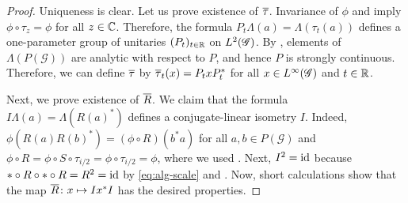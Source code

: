 \begin{proof}
  Uniqueness is clear.  Let us prove existence of $\overline{\tau}$.
  Invariance of $\phi$ and \cite[Theorem 2.25]{DCT1} imply $\phi \circ
  \tau_{z} = \phi$ for all $z\in \mathbb{C}$. Therefore, the formula
  $P_{t}\Lambda(a) = \Lambda(\tau_{t}(a))$ defines a one-parameter
  group of unitaries $(P_{t})_{t\in \mathbb{R}}$ on $L^{2}(\mathscr{G})$. By \cite[Theorem
  2.25]{DCT1}, elements of $\Lambda(P(\mathscr{G}))$ are analytic with
  respect to $P$, and hence $P$ is strongly
  continuous.  Therefore, we can define $\overline{\tau}$ by  $\overline{\tau}_{t}(x)=
  P_{t}xP_{t}^{*}$ for all $x\in L^{\infty}(\mathscr{G})$ and $t\in \mathbb{R}$.
  

  Next, we prove existence of $\overline{R}$. We claim that the formula $
  I\Lambda(a) = \Lambda(R(a)^{*})$ defines a conjugate-linear
  isometry $I$. Indeed, $\phi(R(a)R(b)^{*})= (\phi\circ R)(b^{*}a)$
  for all $a,b\in P(\mathscr{G})$ and $\phi \circ R=\phi \circ S \circ
  \tau_{i/2} = \phi \circ \tau_{i/2}=\phi$, where we used \cite[
  Corollary 2.13]{DCT1}. Next, $I^{2} = \operatorname{id}$ because $*\circ R \circ *
  \circ R= R^{2}=\operatorname{id}$ by \eqref{eq:alg-scale} and \cite[Proposition 1.16]{DCT1}. Now, short calculations show that the map $\overline{R} \colon
  x \mapsto Ix^{*}I$ has the desired properties.


\end{proof}

